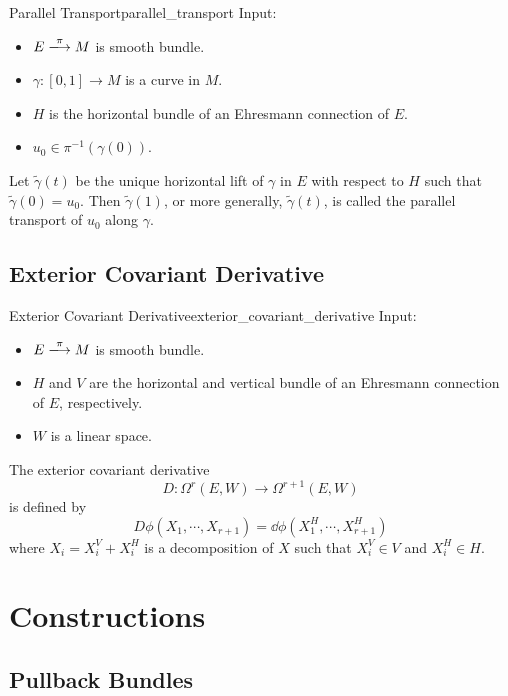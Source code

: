 \documentclass{article}
\begin{document}
\begin{definition}{Parallel Transport}{parallel_transport}
    Input:
    \begin{itemize}
        \item $E\xlongrightarrow{\pi} M$ is smooth bundle.
        \item $\gamma: [0,1] \rightarrow M$ is a curve in $M$.
        \item $H$ is the horizontal bundle of an Ehresmann connection of $E$.
        \item $u_0 \in \pi^{-1}(\gamma(0))$.
    \end{itemize}
    Let $\tilde{\gamma}(t)$ be the unique horizontal lift of $\gamma$ in $E$ with respect to $H$ such that $\tilde{\gamma}(0) = u_0$.
    Then $\tilde{\gamma}(1)$, or more generally, $\tilde{\gamma}(t)$, is called the parallel transport of $u_0$ along $\gamma$.
\end{definition}

\subsection{Exterior Covariant Derivative}

\begin{definition}{Exterior Covariant Derivative}{exterior_covariant_derivative}
    Input:
    \begin{itemize}
        \item $E\xlongrightarrow{\pi} M$ is smooth bundle.
        \item $H$ and $V$ are the horizontal and vertical bundle of an Ehresmann connection of $E$, respectively.
        \item $W$ is a linear space.
    \end{itemize}
    The exterior covariant derivative
    \[ D: \Omega^r(E, W) \rightarrow \Omega^{r+1}(E, W) \]
    is defined by
    \[ {D}\phi(X_1,\cdots,X_{r+1}) = \dd{\phi}(X^H_1, \cdots, X^H_{r+1}) \]
    where $X_i = X^V_{i} + X^H_{i}$ is a decomposition of $X$ such that $X^V_i\in V$ and $X^H_i\in H$.
\end{definition}

\section{Constructions}

\subsection{Pullback Bundles}
\end{document}
